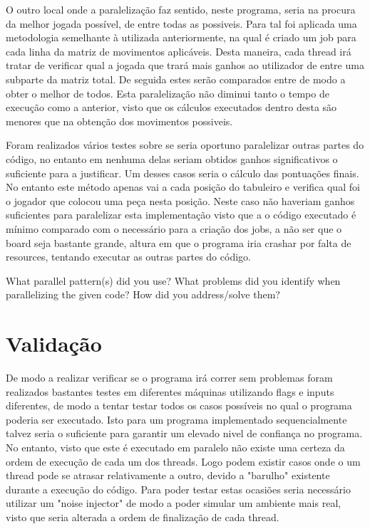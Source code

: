 \documentclass[a4paper]{article}
\begin{document}
O outro local onde a paralelização faz sentido, neste programa, seria na procura da melhor jogada possível, de entre todas as possiveis. Para tal foi aplicada uma metodologia semelhante à utilizada anteriormente, na qual é criado um job para cada linha da matriz de movimentos aplicáveis. Desta maneira, cada thread irá tratar de verificar qual a jogada que trará mais ganhos ao utilizador de entre uma subparte da matriz total. De seguida estes serão comparados entre de modo a obter o melhor de todos. Esta paralelização não diminui tanto o tempo de execução como a anterior, visto que os cálculos executados dentro desta são menores que na obtenção dos movimentos possiveis.

Foram realizados vários testes sobre se seria oportuno paralelizar outras partes do código, no entanto em nenhuma delas seriam obtidos ganhos significativos o suficiente para a justificar. Um desses casos seria o cálculo das pontuações finais. No entanto este método apenas vai a cada posição do tabuleiro e verifica qual foi o jogador que colocou uma peça nesta posição. Neste caso não haveriam ganhos suficientes para paralelizar esta implementação visto que a o código executado é mínimo comparado com o necessário para a criação dos jobs, a não ser que o board seja bastante grande, altura em que o programa iria crashar por falta de resources, tentando executar as outras partes do código.




What	parallel	pattern(s)	did	you	use?	 What	problems	did	you	
identify	 when	 parallelizing	 the	 given	 code?	 	 How	 did	 you	 address/solve	 them?	


\section{Validação}
De modo a realizar verificar se o programa irá correr sem problemas foram realizados bastantes testes em diferentes máquinas utilizando flags e inputs diferentes, de modo a tentar testar todos os casos possíveis no qual o programa poderia ser executado.
Isto para um programa implementado sequencialmente talvez seria o suficiente para garantir um elevado nivel de confiança no programa. No entanto, visto que este é executado em paralelo não existe uma certeza da ordem de execução de cada um dos threads. Logo podem existir casos onde o um thread pode se atrasar relativamente a outro, devido a "barulho" existente durante a execução do código. Para poder testar estas ocasiões seria necessário utilizar um "noise injector" de modo a poder simular um ambiente mais real, visto que seria alterada a ordem de finalização de cada thread.
\end{document}
